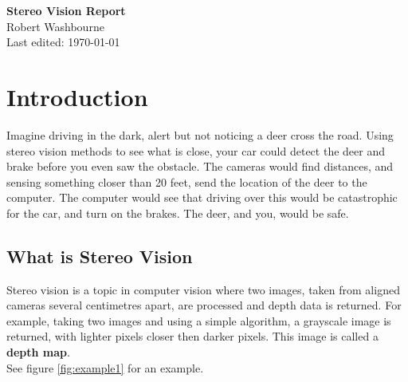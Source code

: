 \documentclass[11pt,fleqn]{article}
\begin{document}
\begin{center}
\Large{\textbf{Stereo Vision Report}}\\[5pt]
\large{Robert Washbourne}\\
Last edited: \today
\end{center}

\tableofcontents
\listoffigures
\newpage

\section{Introduction}

Imagine driving in the dark, alert but not noticing a deer cross the road. Using stereo vision methods to see what is close, your car could detect the deer and brake before you even saw the obstacle. The cameras would find distances, and sensing something closer than 20 feet, send the location of the deer to the computer. The computer would see that driving over this would be catastrophic for the car, and turn on the brakes. The deer, and you, would be safe.

\subsection{What is Stereo Vision}

Stereo vision is a topic in computer vision where two images, taken from aligned cameras several centimetres apart, are processed and depth data is returned. For example, taking two images and using a simple algorithm, a grayscale image is returned, with lighter pixels closer then darker pixels. This image is called a \textbf{depth map}.\\[6pt]
%
See figure \ref{fig:example1} for an example.
\end{document}
